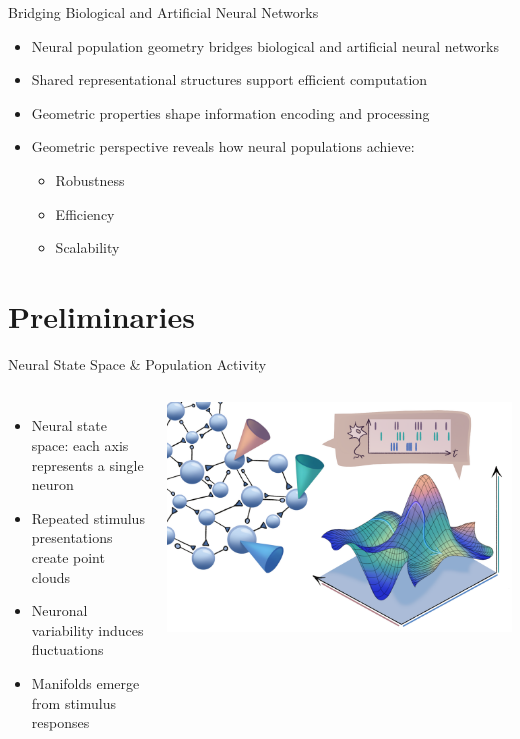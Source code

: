 \documentclass[aspectratio=169]{beamer}
\begin{document}
\begin{frame}{Bridging Biological and Artificial Neural Networks}
    \begin{itemize}
        \item Neural population geometry bridges biological and artificial neural networks
        \item Shared representational structures support efficient computation
        \item Geometric properties shape information encoding and processing
        \item Geometric perspective reveals how neural populations achieve:
        \begin{itemize}
            \item Robustness
            \item Efficiency
            \item Scalability
        \end{itemize}
    \end{itemize}
\end{frame}

\section{Preliminaries}

\begin{frame}{Neural State Space \& Population Activity}
    \begin{columns}
        \begin{itemize}
            \item Neural state space: each axis represents a single neuron
            \item Repeated stimulus presentations create point clouds
            \item Neuronal variability induces fluctuations
            \item Manifolds emerge from stimulus responses
        \end{itemize}
        
        \includegraphics[width=\textwidth]{manifold_schematic.png}
    \end{columns}
\end{frame}
\end{document}
